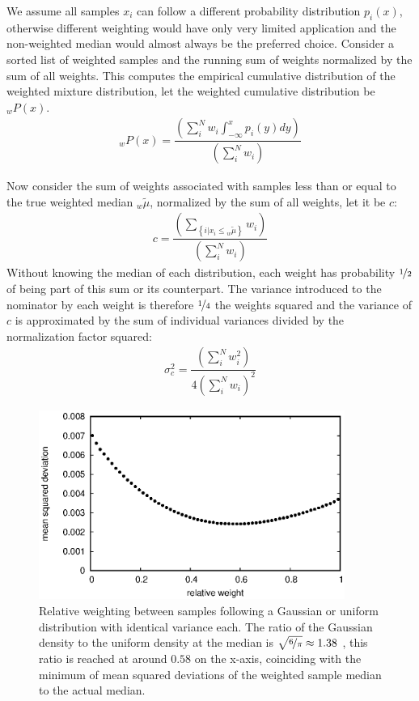 \documentclass[ejs]{imsart}
\numberwithin{equation}{section}
\theoremstyle{plain}
\begin{document}
We assume all samples $x_i$ can follow a different probability distribution $p_i\left(x\right)$, otherwise different weighting would have only very limited application and the non-weighted median would almost always be the preferred choice.
Consider a sorted list of weighted samples and the running sum of weights normalized by the sum of all weights.
This computes the empirical cumulative distribution of the weighted mixture distribution, let the weighted cumulative distribution be ${_wP}\left(x\right)$.
\begin{align*}
{_wP}\left(x\right) = \dfrac{\left( \sum_i^N w_i \int_{-\infty}^x p_i\left(y\right) dy \right)}{\left( \sum_i^N  w_i \right)}
\end{align*}

\noindent Now consider the sum of weights associated with samples less than or equal to the true weighted median ${_w\tilde{\mu}}$, normalized by the sum of all weights, let it be $c$:
\begin{align}
c = \dfrac{\left( \sum_{ \left\{ i | x_i \le {_w\tilde{\mu}} \right\} } w_i \right)}{\left( \sum_i^N  w_i \right)} \label{equation_c}
\end{align}
\noindent Without knowing the median of each distribution, each weight has probability $\nicefrac{1}{2}$ of being part of this sum or its counterpart.
The variance introduced to the nominator by each weight is therefore $\nicefrac{1}{4}$ the weights squared and the variance of $c$ is approximated by the sum of individual variances divided by the normalization factor squared:
\begin{align*}
\sigma^2_c = \dfrac{\left(\sum_i^N w_i^2\right)}{4 \left( \sum_i^N  w_i \right)^2}
\end{align*}

\begin{figure}[b!]
\includegraphics[width=10cm]{optimal_weighting_median.eps}
\caption{Relative weighting between samples following a Gaussian or uniform distribution with identical variance each. The ratio of the Gaussian density to the uniform density at the median is $\sqrt{\nicefrac{6}{\pi}} \approx 1.38$ , this ratio is reached at around $0.58$ on the x-axis, coinciding with the minimum of mean squared deviations of the weighted sample median to the actual median.}\label{median_weights}
\end{figure}
\end{document}
